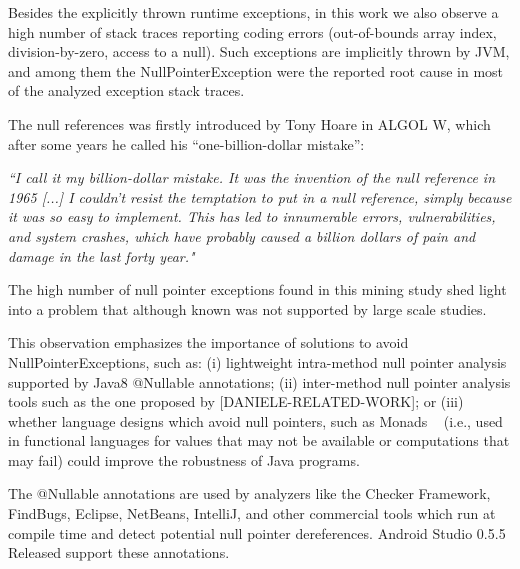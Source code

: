 \documentclass[conference]{IEEEtran}
\begin{document}
Besides the explicitly thrown runtime exceptions, in this work we also observe a high number of 
stack traces reporting coding errors (out-of-bounds array index, division-by-zero, access to a null).
Such exceptions are implicitly thrown by JVM, and among them the NullPointerException 
were the reported root cause in most of the analyzed exception stack traces.

The null references was firstly introduced by Tony Hoare in ALGOL W, which after some years he called his “one-billion-dollar mistake”:

\emph{``I call it my billion-dollar mistake. It was the invention of the null reference in 1965 [...] I couldn’t resist the temptation to put 
in a null reference, simply because it was so easy to implement. This has led to innumerable errors, vulnerabilities, and system 
crashes, which have probably caused a billion dollars of pain and damage in the last forty year."}

The high number of null pointer exceptions found in this mining study shed light into a problem
that although known was not supported by large scale studies. 

This observation emphasizes the importance of solutions to avoid NullPointerExceptions, such as:
(i) lightweight intra-method null pointer analysis supported by Java8 @Nullable annotations;
(ii) inter-method null pointer analysis tools such as the one proposed by [DANIELE-RELATED-WORK];
or (iii) whether language designs which avoid null pointers, such 
as Monads ~\cite{Walde95} (i.e., used in functional languages for values that may not be available 
or computations that may fail) could improve the robustness of Java programs. 

The @Nullable annotations are used by analyzers like the Checker Framework, FindBugs, Eclipse, 
NetBeans, IntelliJ, and other commercial tools which run at compile time and detect potential null 
pointer dereferences. Android Studio 0.5.5 Released support these annotations.



\end{document}
